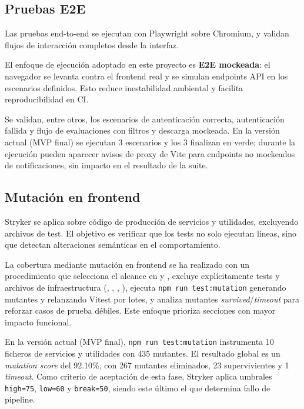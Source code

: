 \subsection{Pruebas E2E}

Las pruebas end-to-end se ejecutan con Playwright sobre Chromium,
y validan flujos de interacci\'on completos desde la interfaz.

El enfoque de ejecuci\'on adoptado en este proyecto es \textbf{E2E mockeada}:
el navegador se levanta contra el frontend real y se simulan endpoints API
en los escenarios definidos. Esto reduce inestabilidad ambiental y facilita
reproducibilidad en CI.

Se validan, entre otros, los escenarios de autenticaci\'on correcta, autenticaci\'on fallida y flujo de evaluaciones con filtros y descarga mockeada. En la versi\'on actual (MVP final) se ejecutan 3 escenarios y los 3 finalizan en verde; durante la ejecuci\'on pueden aparecer avisos de proxy de Vite para endpoints no mockeados de notificaciones, sin impacto en el resultado de la suite.

\subsection{Mutaci\'on en frontend}

Stryker se aplica sobre c\'odigo de producci\'on de servicios y utilidades,
excluyendo archivos de test.
El objetivo es verificar que los tests no solo ejecutan l\'ineas,
sino que detectan alteraciones sem\'anticas en el comportamiento.

La cobertura mediante mutaci\'on en frontend se ha realizado con un procedimiento que selecciona el alcance en  y , excluye expl\'icitamente tests y archivos de infraestructura (, , , ), ejecuta \texttt{npm run test:mutation} generando mutantes y relanzando Vitest por lotes, y analiza mutantes \textit{survived}/\textit{timeout} para reforzar casos de prueba d\'ebiles. Este enfoque prioriza secciones con mayor impacto funcional.

En la versi\'on actual (MVP final), \texttt{npm run test:mutation} instrumenta 10 ficheros de servicios y utilidades con 435 mutantes. El resultado global es un \textit{mutation score} del 92.10\%, con 267 mutantes eliminados, 23 supervivientes y 1 \textit{timeout}. Como criterio de aceptaci\'on de esta fase, Stryker aplica umbrales \texttt{high=75}, \texttt{low=60} y \texttt{break=50}, siendo este \'ultimo el que determina fallo de pipeline.

